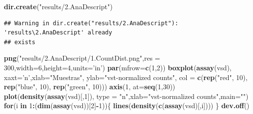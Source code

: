 \documentclass[
]{article}
\newenvironment{Shaded}{\begin{snugshade}}{\end{snugshade}}
\newcommand{\ControlFlowTok}[1]{\textcolor[rgb]{0.13,0.29,0.53}{\textbf{#1}}}
\newcommand{\DataTypeTok}[1]{\textcolor[rgb]{0.13,0.29,0.53}{#1}}
\newcommand{\DecValTok}[1]{\textcolor[rgb]{0.00,0.00,0.81}{#1}}
\newcommand{\KeywordTok}[1]{\textcolor[rgb]{0.13,0.29,0.53}{\textbf{#1}}}
\newcommand{\NormalTok}[1]{#1}
\newcommand{\OperatorTok}[1]{\textcolor[rgb]{0.81,0.36,0.00}{\textbf{#1}}}
\newcommand{\StringTok}[1]{\textcolor[rgb]{0.31,0.60,0.02}{#1}}
\begin{document}
\begin{Shaded}
\begin{Highlighting}[]
\KeywordTok{dir.create}\NormalTok{(}\StringTok{"results/2.AnaDescript"}\NormalTok{)}
\end{Highlighting}
\end{Shaded}

\begin{verbatim}
## Warning in dir.create("results/2.AnaDescript"): 'results\2.AnaDescript' already
## exists
\end{verbatim}

\begin{Shaded}
\begin{Highlighting}[]
\KeywordTok{png}\NormalTok{(}\StringTok{"results/2.AnaDescript/1.CountDist.png"}\NormalTok{,}\DataTypeTok{res =} \DecValTok{300}\NormalTok{,}\DataTypeTok{width=}\DecValTok{6}\NormalTok{,}\DataTypeTok{height=}\DecValTok{4}\NormalTok{,}\DataTypeTok{units=}\StringTok{'in'}\NormalTok{)}
\KeywordTok{par}\NormalTok{(}\DataTypeTok{mfrow=}\KeywordTok{c}\NormalTok{(}\DecValTok{1}\NormalTok{,}\DecValTok{2}\NormalTok{))}
\KeywordTok{boxplot}\NormalTok{(}\KeywordTok{assay}\NormalTok{(vsd), }\DataTypeTok{xaxt=}\StringTok{'n'}\NormalTok{,}\DataTypeTok{xlab=}\StringTok{"Muestras"}\NormalTok{, }\DataTypeTok{ylab=}\StringTok{"vst-normalized counts"}\NormalTok{,}
        \DataTypeTok{col =} \KeywordTok{c}\NormalTok{(}\KeywordTok{rep}\NormalTok{(}\StringTok{"red"}\NormalTok{, }\DecValTok{10}\NormalTok{), }\KeywordTok{rep}\NormalTok{(}\StringTok{"blue"}\NormalTok{, }\DecValTok{10}\NormalTok{), }\KeywordTok{rep}\NormalTok{(}\StringTok{"green"}\NormalTok{, }\DecValTok{10}\NormalTok{)))}
\KeywordTok{axis}\NormalTok{(}\DecValTok{1}\NormalTok{, }\DataTypeTok{at=}\KeywordTok{seq}\NormalTok{(}\DecValTok{1}\NormalTok{,}\DecValTok{30}\NormalTok{))}
\KeywordTok{plot}\NormalTok{(}\KeywordTok{density}\NormalTok{(}\KeywordTok{assay}\NormalTok{(vsd)[,}\DecValTok{1}\NormalTok{]), }\DataTypeTok{type =} \StringTok{"n"}\NormalTok{,}\DataTypeTok{xlab=}\StringTok{"vst-normalized counts"}\NormalTok{,}\DataTypeTok{main=}\StringTok{""}\NormalTok{)}
\ControlFlowTok{for}\NormalTok{(i }\ControlFlowTok{in} \DecValTok{1}\OperatorTok{:}\NormalTok{(}\KeywordTok{dim}\NormalTok{(}\KeywordTok{assay}\NormalTok{(vsd))[}\DecValTok{2}\NormalTok{]}\OperatorTok{-}\DecValTok{1}\NormalTok{))\{}
  \KeywordTok{lines}\NormalTok{(}\KeywordTok{density}\NormalTok{(}\KeywordTok{c}\NormalTok{(}\KeywordTok{assay}\NormalTok{(vsd)[,i])))}
\NormalTok{\}}
\KeywordTok{dev.off}\NormalTok{()}
\end{Highlighting}
\end{Shaded}
\end{document}
